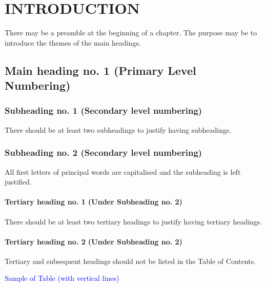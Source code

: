 \chapter{INTRODUCTION}
There may be a preamble at the beginning of a chapter. The purpose may be to introduce the themes of the main headings.

\section{Main heading no. 1 (Primary Level Numbering)}

\subsection{Subheading no. 1 (Secondary level numbering)}
There should be at least two subheadings to justify having subheadings.

\subsection{Subheading no. 2 (Secondary level numbering)}
All first letters of principal words are capitalised and the subheading is left justified.

\subsubsection{Tertiary heading no. 1 (Under Subheading no. 2)}
There should be at least two tertiary headings to justify having tertiary headings.

\subsubsection{Tertiary heading no. 2 (Under Subheading no. 2)}
Tertiary and subsequent headings should not be listed in the Table of Contents.

\newpage
\textcolor{blue}{Sample of Table (with vertical lines)}

